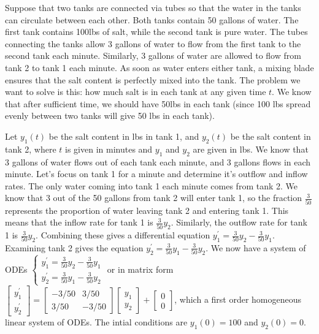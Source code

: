 Suppose that two tanks are connected via tubes so that the water in the tanks can circulate between each other.  Both tanks contain 50 gallons of water. The first tank contains 100lbs of salt, while the second tank is pure water.  The tubes connecting the tanks allow 3 gallons of water to flow from the first tank to the second tank each minute.  Similarly, 3 gallons of water are allowed to flow from tank 2 to tank 1 each minute. As soon as water enters either tank, a mixing blade ensures that the salt content is perfectly mixed into the tank.  The problem we want to solve is this: how much salt is in each tank at any given time $t$.  We know that after sufficient time, we should have 50lbs in each tank (since 100 lbs spread evenly between two tanks will give 50 lbs in each tank).

Let $y_1(t)$ be the salt content in lbs in tank 1, and $y_2(t)$ be the salt content in tank 2, where $t$ is given in minutes and $y_1$ and $y_2$ are given in lbs. We know that 3 gallons of water flows out of each tank each minute, and 3 gallons flows in each minute.  Let's focus on tank 1 for a minute and determine it's outflow and inflow rates.  The only water coming into tank 1 each minute comes from tank 2.  We know that 3 out of the 50 gallons from tank 2 will enter tank 1, so the fraction $\frac{3}{50}$ represents the proportion of water leaving tank 2 and entering tank 1. This means that the inflow rate for tank 1 is $\frac{3}{50}y_2$.  Similarly, the outflow rate for tank 1 is $\frac{3}{50}y_2$.  Combining these gives a differential equation $y_1^\prime = \frac{3}{50}y_2 - \frac{3}{50}y_1$.  Examining tank 2 gives the equation $y_2^\prime = \frac{3}{50}y_1 - \frac{3}{50}y_2$.  We now have a system of ODEs 
$\begin{cases}
y_1^\prime = \frac{3}{50}y_2 - \frac{3}{50}y_1\\
y_2^\prime = \frac{3}{50}y_1 - \frac{3}{50}y_2
\end{cases}$ or in matrix form 
$
\begin{bmatrix}
y_1^\prime\\
y_2^\prime
\end{bmatrix}
=
\begin{bmatrix}
-3/50&3/50\\
3/50&-3/50
\end{bmatrix}
\begin{bmatrix}
y_1\\
y_2
\end{bmatrix}
+
\begin{bmatrix}
0\\
0
\end{bmatrix}$, which a first order homogeneous linear system of ODEs. The intial conditions are $y_1(0)=100$ and $y_2(0)=0$.



